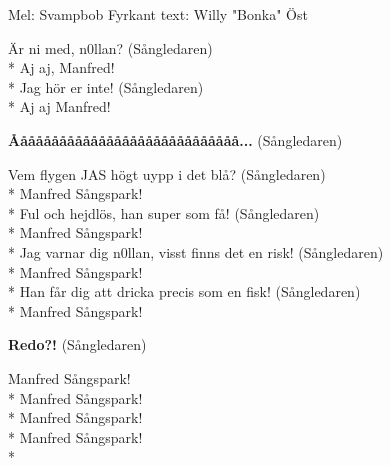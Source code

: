 \begin{SongText}
    \begin{SongInfo}
        Mel: Svampbob Fyrkant
        text: Willy "Bonka" Öst
    \end{SongInfo}
    \begin{SongVerse}
        Är ni med, n0llan? (Sångledaren)\\*%
        Aj aj, Manfred!\\*%
        Jag hör er inte! (Sångledaren)\\*%
        Aj aj Manfred!
    \end{SongVerse}
    \begin{SongVerse}
        \textbf{Ååååååååååååååååååååååååååååå...} (Sångledaren)
    \end{SongVerse}
    \begin{SongVerse}
        Vem flygen JAS högt uypp i det blå? (Sångledaren)\\*%
        Manfred Sångspark!\\*%
        Ful och hejdlös, han super som få! (Sångledaren)\\*%
        Manfred Sångspark!\\*%
        Jag varnar dig n0llan, visst finns det en risk! (Sångledaren)\\*%
        Manfred Sångspark!\\*%
        Han får dig att dricka precis som en fisk! (Sångledaren)\\*%
        Manfred Sångspark!
    \end{SongVerse}
    \begin{SongVerse}
        \textbf{Redo?!} (Sångledaren)
    \end{SongVerse}
    \begin{SongVerse}
        Manfred Sångspark!\\*%
        Manfred Sångspark!\\*%
        Manfred Sångspark!\\*%
        Manfred Sångspark!\\*%
    \end{SongVerse}
\end{SongText}

